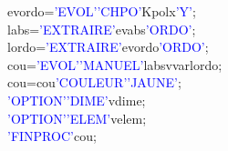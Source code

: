 evordo\hspace*{1em}=\hspace*{1em}\textcolor{blue}{'EVOL'}\hspace*{1em}\textcolor{blue}{'CHPO'}\hspace*{1em}Kpo\hspace*{1em}lx\hspace*{1em}\textcolor{blue}{'Y'};\\
labs\hspace*{1em}=\hspace*{1em}\textcolor{blue}{'EXTRAIRE'}\hspace*{1em}evabs\hspace*{1em}\textcolor{blue}{'ORDO'}\hspace*{1em};\\
lordo\hspace*{1em}=\hspace*{1em}\textcolor{blue}{'EXTRAIRE'}\hspace*{1em}evordo\hspace*{1em}\textcolor{blue}{'ORDO'}\hspace*{1em};\\
cou\hspace*{1em}=\hspace*{1em}\textcolor{blue}{'EVOL'}\hspace*{1em}\textcolor{blue}{'MANUEL'}\hspace*{1em}labs\hspace*{1em}vvar\hspace*{1em}lordo\hspace*{1em};\\
cou\hspace*{1em}=\hspace*{1em}cou\hspace*{1em}\hspace*{1em}\textcolor{blue}{'COULEUR'}\hspace*{1em}\textcolor{blue}{'JAUNE'};\\
\textcolor{blue}{'OPTION'}\hspace*{1em}\textcolor{blue}{'DIME'}\hspace*{1em}vdime;\\
\textcolor{blue}{'OPTION'}\hspace*{1em}\textcolor{blue}{'ELEM'}\hspace*{1em}velem;\\
\textcolor{blue}{'FINPROC'}\hspace*{1em}cou\hspace*{1em};
